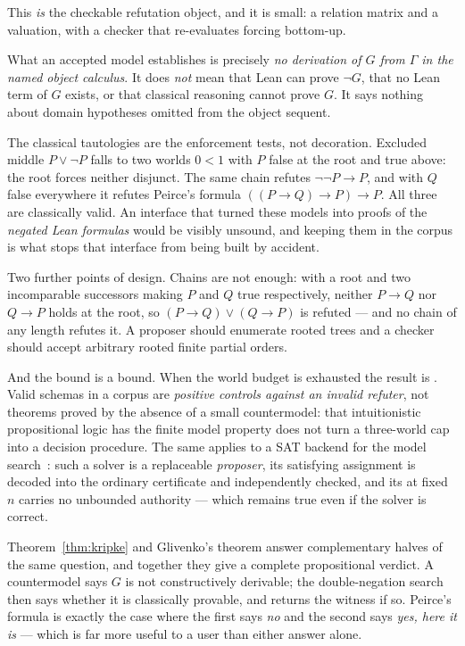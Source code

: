 This \emph{is} the checkable refutation object, and it is small: a relation
matrix and a valuation, with a checker that re-evaluates forcing bottom-up.

\begin{remark}
\label{rem:kripke-ceiling}
What an accepted model establishes is precisely \emph{no derivation of $G$ from
$\Gamma$ in the named object calculus}. It does \emph{not} mean that Lean can
prove $\neg G$, that no Lean term of $G$ exists, or that classical reasoning
cannot prove $G$. It says nothing about domain hypotheses omitted from the
object sequent.

The classical tautologies are the enforcement tests, not decoration. Excluded
middle $P\lor\neg P$ falls to two worlds $0<1$ with $P$ false at the root and
true above: the root forces neither disjunct. The same chain refutes
$\neg\neg P\to P$, and with $Q$ false everywhere it refutes Peirce's formula
$((P\to Q)\to P)\to P$. All three are classically valid. An interface that
turned these models into proofs of the \emph{negated Lean formulas} would be
visibly unsound, and keeping them in the corpus is what stops that interface
from being built by accident.
\end{remark}

Two further points of design. Chains are not enough: with a root and two
incomparable successors making $P$ and $Q$ true respectively, neither $P\to Q$
nor $Q\to P$ holds at the root, so $(P\to Q)\lor(Q\to P)$ is refuted --- and no
chain of any length refutes it. A proposer should enumerate rooted trees and a
checker should accept arbitrary rooted finite partial orders.

And the bound is a bound. When the world budget is exhausted the result is
\unknown{}. Valid schemas in a corpus are \emph{positive controls against an
invalid refuter}, not theorems proved by the absence of a small countermodel:
that intuitionistic propositional logic has the finite model property does not
turn a three-world cap into a decision procedure. The same applies to a SAT
backend for the model search~\cite{pysat}: such a solver is a replaceable
\emph{proposer}, its satisfying assignment is decoded into the ordinary
certificate and independently checked, and its  at fixed $n$
carries no unbounded authority --- which remains true even if the solver is
correct.

\begin{remark}
Theorem~\ref{thm:kripke} and Glivenko's theorem answer complementary halves of
the same question, and together they give a complete propositional verdict. A
countermodel says $G$ is not constructively derivable; the double-negation
search then says whether it is classically provable, and returns the witness if
so. Peirce's formula is exactly the case where the first says \emph{no} and the
second says \emph{yes, here it is} --- which is far more useful to a user than
either answer alone.
\end{remark}

